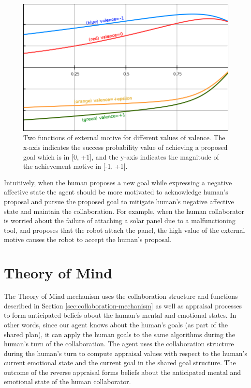 \documentclass[12pt]{report}
\begin{document}
\begin{figure}[t]
  \centering
  \includegraphics[width=1\textwidth]{figure/external_motive_functions.png}
  \caption{Two functions of external motive for different values of valence. The
  x-axis indicates the success probability value of achieving a proposed goal
  which is in [0, +1], and the y-axis indicates the magnitude of the achievement
  motive in [-1, +1].}
  \label{fig:external-motive-functions}
\end{figure}

Intuitively, when the human proposes a new goal while expressing a negative
affective state the agent should be more motivated to acknowledge human's proposal and
pursue the proposed goal to mitigate human's negative affective state and maintain the
collaboration. For example, when the human collaborator is worried
about the failure of attaching a solar panel due to a malfunctioning tool,
and proposes that the robot attach the panel, the high value of the external
motive causes the robot to accept the human's proposal.

\section{Theory of Mind}
\label{sec:theory-of-mind-implementation}
The Theory of Mind mechanism uses the collaboration structure and
functions described in Section \ref{sec:collaboration-mechanism} as well as appraisal
processes to form anticipated beliefs about the human's mental and emotional
states. In other words, since our agent knows about the human's goals (as part
of the shared plan), it can apply the human goals to the same algorithms during
the human's turn of the collaboration. The agent uses the collaboration
structure during the human's turn to compute appraisal values with respect to
the human's current emotional state and the current goal in the shared goal
structure. The outcome of the reverse appraisal forms beliefs about the
anticipated mental and emotional state of the human collaborator.
\end{document}
